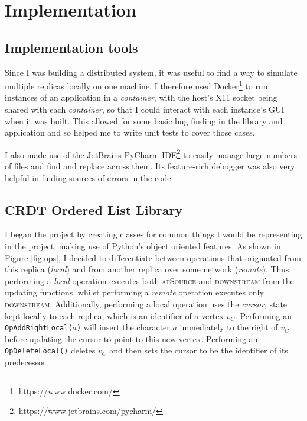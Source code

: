 \documentclass[diss.tex]{subfiles}
\begin{document}
\chapter{Implementation}
\label{chap:implementation}
\section{Implementation tools}
Since I was building a distributed system, it was useful to find a way to simulate multiple replicas locally on one machine. I therefore used Docker\footnote{https://www.docker.com/} to run instances of an application in a \textit{container}, with the host's X11 socket being shared with each \textit{container}, so that I could interact with each instance's GUI when it was built. This allowed for some basic bug finding in the library and application and so helped me to write unit tests to cover those cases.

I also made use of the JetBrains PyCharm IDE\footnote{https://www.jetbrains.com/pycharm/} to easily manage large numbers of files and find and replace across them. Its feature-rich debugger was also very helpful in finding sources of errors in the code. 

\section{CRDT Ordered List Library}
I began the project by creating classes for common things I would be representing in the project, making use of Python's object oriented features. As shown in Figure \ref{fig:ops}, I decided to differentiate between operations that originated from this replica (\textit{local}) and from another replica over some network (\textit{remote}). Thus, performing a \textit{local} operation executes both \textsc{atSource} and \textsc{downstream} from the updating functions, whilst performing a \textit{remote} operation executes only \textsc{downstream}. Additionally, performing a local operation uses the \textit{cursor}, state kept locally to each replica, which is an identifier of a vertex $v_C$. Performing an \texttt{OpAddRightLocal($a$)} will insert the character $a$ immediately to the right of $v_C$ before updating the cursor to point to this new vertex. Performing an \texttt{OpDeleteLocal()} deletes $v_C$ and then sets the cursor to be the identifier of its predecessor.
\end{document}

